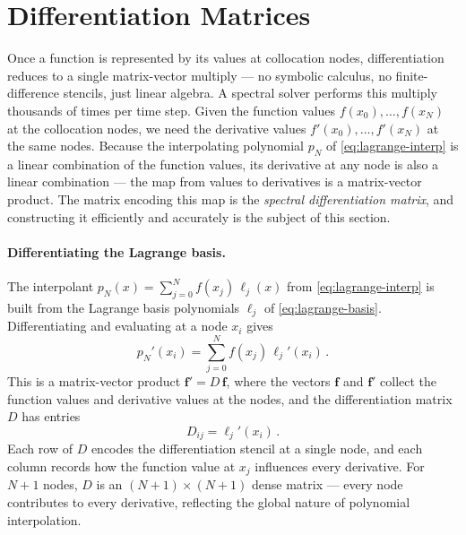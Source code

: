 \section{Differentiation Matrices}
\label{sec:spec-diffmat}

Once a function is represented by its values at collocation nodes,
differentiation reduces to a single matrix-vector multiply --- no
symbolic calculus, no finite-difference stencils, just linear
algebra.  A spectral solver performs this multiply thousands of
times per time step.  Given the function values
$f(x_0), \ldots, f(x_N)$ at the
collocation nodes, we need the derivative values
$f'(x_0), \ldots, f'(x_N)$ at the same nodes.  Because the
interpolating polynomial $p_N$ of \cref{eq:lagrange-interp} is a
linear combination of the function values, its derivative at any node
is also a linear combination --- the map from values to derivatives is
a matrix-vector product.  The matrix encoding this map is the
\emph{spectral differentiation matrix}, and constructing it
efficiently and accurately is the subject of this section.

\paragraph{Differentiating the Lagrange basis.}

The interpolant $p_N(x) = \sum_{j=0}^{N} f(x_j)\,\ell_j(x)$ from
\cref{eq:lagrange-interp} is built from the Lagrange basis polynomials
$\ell_j$ of \cref{eq:lagrange-basis}.  Differentiating and evaluating
at a node $x_i$ gives
%
\begin{equation}
  p_N'(x_i) = \sum_{j=0}^{N} f(x_j)\,\ell_j'(x_i) \,.
  \label{eq:diffmat-deriv}
\end{equation}
%
This is a matrix-vector product $\mathbf{f}' = D\,\mathbf{f}$, where
the vectors $\mathbf{f}$ and $\mathbf{f}'$ collect the function values
and derivative values at the nodes, and the differentiation matrix $D$
has entries
%
\begin{equation}
  D_{ij} = \ell_j'(x_i) \,.
  \label{eq:diffmat-def}
\end{equation}
%
Each row of $D$ encodes the differentiation stencil at a single node,
and each column records how the function value at $x_j$ influences
every derivative.  For $N + 1$ nodes, $D$ is an
$(N+1) \times (N+1)$ dense matrix --- every node contributes to
every derivative, reflecting the global nature of polynomial
interpolation.

